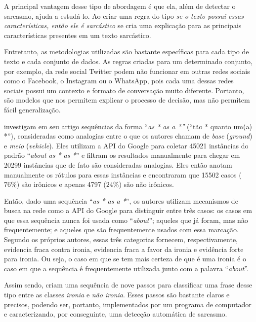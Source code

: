 A principal vantagem desse tipo de abordagem é que ela, além de detectar o
sarcasmo, ajuda a estudá-lo. Ao criar uma regra do tipo \textit{se o texto
possui essas características, então ele é sarcástico} se cria uma explicação
para as principais características presentes em um texto sarcástico.

Entretanto, as metodologias utilizadas são bastante específicas para cada tipo
de texto e cada conjunto de dados. As regras criadas para um determinado
conjunto, por exemplo, da rede social Twitter podem não funcionar em outras
redes sociais como o Facebook, o Instagram ou o WhatsApp, pois cada uma dessas
redes sociais possui um contexto e formato de conversação muito diferente.
Portanto, são modelos que nos permitem explicar o processo de decisão, mas não
permitem fácil generalização.

\cite{veale:2010} investigam em seu artigo sequências da forma ``\textit{as * as
a *''} (``tão * quanto um(a) *''), consideradas como analogias entre o que os
autores chamam de \textit{base} (\textit{ground}) e \textit{meio}
(\textit{vehicle}). Eles utilizam a API do Google para coletar 45021 instâncias
do padrão ``\textit{about as * as *}'' e filtram os resultados manualmente para
chegar em 20299 instâncias que de fato são consideradas analogias. Eles então
anotam manualmente os rótulos para essas instâncias e encontraram que 15502
casos ($76\%$) são irônicos e apenas 4797 ($24\%$) são não irônicos.

Então, dado uma sequência ``\textit{as * as a *}'', os autores utilizam
mecanismos de busca na rede como a API do Google para distinguir entre três
casos: os casos em que essa sequência nunca foi usada como ``\textit{about}'';
aqueles que já foram, mas não frequentemente; e aqueles que são frequentemente
usados com essa marcação. Segundo os próprios autores, essas três categorias
fornecem, respectivamente, evidencia fraca contra ironia, evidencia fraca a
favor da ironia e evidência forte para ironia. Ou seja, o caso em que se tem
mais certeza de que é uma ironia é o caso em que a sequência é frequentemente
utilizada junto com a palavra ``\textit{about}''.

Assim sendo, \cite{veale:2010} criam uma sequência de nove passos para
classificar uma frase desse tipo entre as classes \textit{ironia} e \textit{não
ironia}. Esses passos são bastante claros e precisos, podendo ser, portanto,
implementados por um programa de computador e caracterizando, por conseguinte,
uma detecção automática de sarcasmo.

